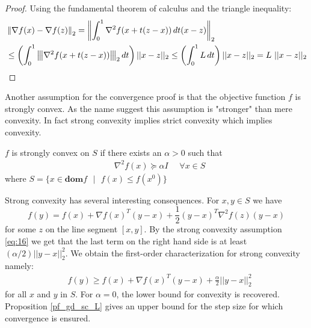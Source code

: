 \begin{proof}
Using the fundamental theorem of calculus and the triangle inequality:
\begin{align*}
&\left\Vert\nabla f(x) - \nabla f(z)\right\Vert_{2}
=\left\Vert\int_{0}^{1} \nabla^{2} f(x + t(z-x))\,dt(x-z)\right\Vert_{2}\\
&\leq \left(\int_{0}^{1} {\left\vert\kern-0.25ex\left\vert\kern-0.25ex\left\vert \nabla^{2} f(x + t(z-x)) \right\vert\kern-0.25ex\right\vert\kern-0.25ex\right\vert}_{2} \,dt\right) ||x-z||_{2} \leq \left(\int_{0}^{1} L \,dt\right) ||x-z||_{2} = L\text{ }||x-z||_{2}
\end{align*}
\end{proof}
Another assumption for the convergence proof is that the objective function $f$ is strongly convex. As the name suggest this assumption is "stronger" than mere convexity. In fact strong convexity implies strict convexity which implies convexity. 
\begin{definition}
\cite[459]{boyd2004convex}
$f$ is strongly convex on $S$ if there exists an $\alpha > 0$ such that
\begin{equation*}\label{eq:16}\tag{3.1.1.3}
\begin{aligned}
    &\nabla^{2} f(x) \succcurlyeq \alpha I \text{ } \text{ }\forall x \in S
\end{aligned}
\end{equation*}
where $S = \{x \in \textbf{dom} f \text{ }|\text{ } f(x) \leq f(x^{0})\}$
\end{definition}
Strong convexity has several interesting consequences. For $x,y \in S$ we have
$$f(y) = f(x) + \nabla f(x)^{T}(y-x) + \frac{1}{2} (y-x)^{T}\nabla^{2} f(z) (y-x)$$
for some $z$ on the line segment $[x, y].$ By the strong convexity assumption \ref{eq:16} we get that the last term on the right hand side is at least $(\alpha/2)||y-x||^{2}_{2}.$ We obtain the first-order characterization for strong convexity namely:
\begin{equation*}\label{eq:17}\tag{3.1.1.4}
\begin{aligned}
    &f(y) \geq f(x) + \nabla f(x)^{T}(y-x) + \frac{\alpha}{2}||y-x||^{2}_{2}
\end{aligned}
\end{equation*}
for all $x$ and $y$ in $S$. For $\alpha=0$, the lower bound for convexity is recovered. Proposition \ref{pf_gd_sc_L} gives an upper bound for the step size for which convergence is ensured.

